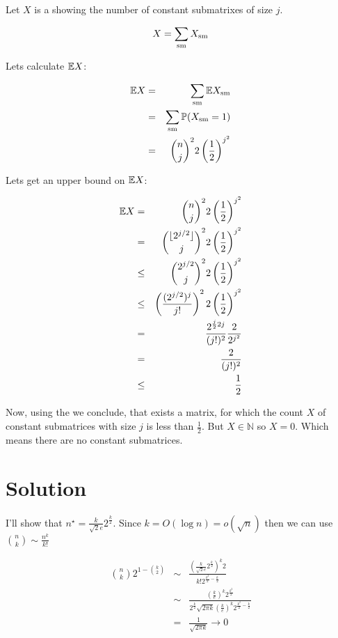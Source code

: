 \documentclass[a4paper]{article}
\begin{document}
Let $ X $ is a \rv showing the number of constant submatrixes of size $ j $.

$$
  X = \sum_{\mathrm{sm}} X_{\mathrm{sm}}
$$

Lets calculate $ \mathbb{E} X $:

\begin{eqnarray*}
  \mathbb{E} X &=& \sum_{\mathrm{sm}} \mathbb{E} X_{\mathrm{sm}} \\
       &=& \sum_{\mathrm{sm}} \mathbb{P}(X_{\mathrm{sm}} = 1) \\
       &=& \binom{n}{j}^2 2 \left(\frac{1}{2}\right)^{j^2} \\
\end{eqnarray*}

Lets get an upper bound on $ \mathbb{E} X $:

\begin{eqnarray*}
  \mathbb{E} X &=& \binom{n}{j}^2 2 \left(\frac{1}{2}\right)^{j^2} \\
       &=& \binom{\lfloor 2^{j/2} \rfloor}{j}^2 2 \left(\frac{1}{2}\right)^{j^2} \\
       &\le& \binom{2^{j/2}}{j}^2 2 \left(\frac{1}{2}\right)^{j^2} \\
       &\le& \left(\frac{(2^{j/2})^j}{j!}\right)^2 2\left(\frac{1}{2}\right)^{j^2} \\
       &=& \frac{2^{\frac{j}{2} 2j}}{(j!)^2} \frac{2}{2^{j^2}} \\
       &=& \frac{2}{(j!)^2} \\
       &\le& \frac{1}{2}
\end{eqnarray*}

Now, using the \FMM we conclude, that exists a matrix, for which the count $ X $ of constant submatrices with size $ j $ is less than $ \frac{1}{2} $. But $ X \in \mathbb{N} $ so $ X = 0 $. Which means there are no constant submatrices. \endproof

\section{Solution}

I'll show that $ n^\star = \frac{k}{\sqrt{2}e}2^{\frac{k}{2}} $. Since $ k = O(\log n) = o(\sqrt n) $ then we can use $ \binom{n}{k} \sim \frac{n^k}{k!} $

\begin{eqnarray*}
  \binom{n}{k} 2^{1-\binom{k}{2}}
  &\sim& \frac{\left(\frac{k}{\sqrt{2}e} 2^{\frac{k}{2}}\right)^k 2}{k! 2^{\frac{k^2}{2}-\frac{k}{2}}} \\
  &\sim& \frac{
              \left(\frac{k}{e}\right)^k 2^\frac{k^2}{2}
          }{
              2^{\frac{k}{2}} \sqrt{2\pi k} \left(\frac{k}{e}\right)^k 2^{\frac{k^2}{2}-\frac{k}{2}}
          } \\
  &=& \frac{1}{\sqrt{2\pi k}} \longrightarrow 0
\end{eqnarray*}
\end{document}

